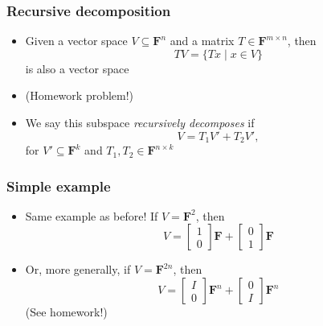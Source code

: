 \documentclass{beamer}
\newcommand{\field}{\mathbf{F}}
\begin{document}
    \begin{frame}
        \frametitle{Recursive decomposition}
        \begin{itemize}\itemsep=12pt
            \item Given a vector space $V\subseteq \field^{n}$ and a matrix $T\in
                \field^{m \times n}$, then
            \[
                TV = \{Tx \mid x \in V\}
            \]
            is also a vector space

            \pause

            \item (Homework problem!)

            \pause

            \item We say this subspace \emph{recursively decomposes} if 
            \[
                V = T_1V' + T_2V',
            \]
            for $V' \subseteq \field^{k}$ and $T_1, T_2 \in \field^{n \times k}$
        \end{itemize}
	\end{frame}

    \begin{frame}
        \frametitle{Simple example}
        \begin{itemize}\itemsep=12pt
            \item Same example as before! If $V = \field^2$, then
            \[
                V = \begin{bmatrix} 1\\0 \end{bmatrix}\field + \begin{bmatrix} 0\\1 \end{bmatrix}\field
            \]

            \pause

            \item Or, more generally, if $V=\field^{2n}$, then
            \[
                V = \begin{bmatrix} I\\0 \end{bmatrix}\field^n + \begin{bmatrix} 0\\I \end{bmatrix}\field^n 
            \]
            (See homework!)
        \end{itemize}
	\end{frame}
\end{document}
